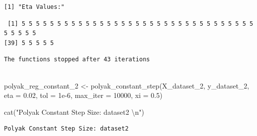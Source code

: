 \documentclass[
  letterpaper,
  DIV=11,
  numbers=noendperiod]{scrartcl}
\newenvironment{Shaded}{\begin{snugshade}}{\end{snugshade}}
\newcommand{\AttributeTok}[1]{\textcolor[rgb]{0.40,0.45,0.13}{#1}}
\newcommand{\DecValTok}[1]{\textcolor[rgb]{0.68,0.00,0.00}{#1}}
\newcommand{\FloatTok}[1]{\textcolor[rgb]{0.68,0.00,0.00}{#1}}
\newcommand{\FunctionTok}[1]{\textcolor[rgb]{0.28,0.35,0.67}{#1}}
\newcommand{\NormalTok}[1]{\textcolor[rgb]{0.00,0.23,0.31}{#1}}
\newcommand{\OtherTok}[1]{\textcolor[rgb]{0.00,0.23,0.31}{#1}}
\newcommand{\SpecialCharTok}[1]{\textcolor[rgb]{0.37,0.37,0.37}{#1}}
\newcommand{\StringTok}[1]{\textcolor[rgb]{0.13,0.47,0.30}{#1}}
\begin{document}
\begin{verbatim}
[1] "Eta Values:"
\end{verbatim}

\begin{Shaded}
\end{Shaded}

\begin{verbatim}
 [1] 5 5 5 5 5 5 5 5 5 5 5 5 5 5 5 5 5 5 5 5 5 5 5 5 5 5 5 5 5 5 5 5 5 5 5 5 5 5
[39] 5 5 5 5 5
\end{verbatim}

\begin{Shaded}
\end{Shaded}

\begin{verbatim}
The functions stopped after 43 iterations 
 
\end{verbatim}

\begin{Shaded}
\begin{Highlighting}[]
\NormalTok{polyak\_reg\_constant\_2 }\OtherTok{\textless{}{-}} \FunctionTok{polyak\_constant\_step}\NormalTok{(X\_dataset\_2, y\_dataset\_2, }\AttributeTok{eta =} \FloatTok{0.02}\NormalTok{, }\AttributeTok{tol =} \FloatTok{1e{-}6}\NormalTok{, }\AttributeTok{max\_iter =} \DecValTok{10000}\NormalTok{, }\AttributeTok{xi =} \FloatTok{0.5}\NormalTok{)}

\FunctionTok{cat}\NormalTok{(}\StringTok{"Polyak Constant Step Size: dataset2 }\SpecialCharTok{\textbackslash{}n}\StringTok{"}\NormalTok{)}
\end{Highlighting}
\end{Shaded}

\begin{verbatim}
Polyak Constant Step Size: dataset2 
\end{verbatim}
\end{document}
